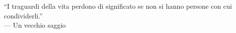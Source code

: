 
\cleardoublepage
{}
\thispagestyle{empty}

\vspace*{3cm}

\begin{center}
``I traguardi della vita perdono di significato se non si hanno persone con cui condividerli.'' \\ \medskip
--- Un vecchio saggio   
\end{center}

\medskip

\begin{center}

\end{center}
